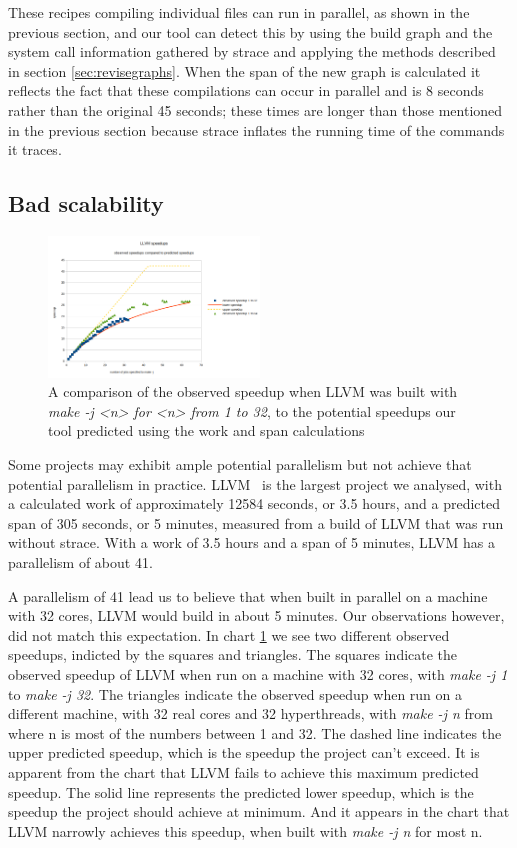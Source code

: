 \documentclass[sigconf,10pt,authorversion]{acmart}\settopmatter{printfolios=true,printccs=false,printacmref=false}
\begin{document}
  These recipes compiling individual files can run in parallel, as shown in the previous section,
  and our tool can detect this by using the build graph and the system call information gathered
  by strace and applying the methods described in section \ref{sec:revisegraphs}.  When the span
  of the new graph is calculated it reflects the fact that these compilations can occur in
  parallel and is 8 seconds rather than the original 45 seconds; these times are longer than
  those mentioned in the previous section because strace inflates the running time of the
  commands it traces.

\subsection{Bad scalability}
\label{sec:scalability}

\begin{figure}[t]
  \includegraphics[width=0.5\textwidth]{llvm-speedup-w-64}
  \caption{A comparison of the observed speedup when LLVM was built with \emph{make -j <n> for <n> from 1 to 32},
    to the potential speedups our tool predicted using the work and span calculations}
  \label{fig:llvm}
\end{figure}

Some projects may exhibit ample potential parallelism but not achieve that potential
parallelism in practice.  LLVM~\citep{LLVM:CGO04} is the largest
project we analysed, with a calculated work of approximately 12584 seconds, or 3.5 hours, and
a predicted span of 305 seconds, or 5 minutes, measured from a build of LLVM that was run without
strace. With a work of 3.5 hours and a span of 5 minutes, LLVM has a parallelism of about 41.

A parallelism of 41 lead us to believe that when built in parallel on a machine with 32 cores,
LLVM would build in about 5 minutes.  Our observations however, did not match this expectation.
In chart \ref{fig:llvm} we see two different observed speedups, indicted by the squares and
triangles.  The squares indicate the observed speedup of LLVM when run on a machine with 32 cores,
with \emph{make -j 1} to \emph{make -j 32}.  The triangles indicate the observed speedup when run
on a different machine, with 32 real cores and 32 hyperthreads, with \emph{make -j n} from where
n is most of the numbers between 1 and 32.  The dashed line indicates the upper predicted speedup,
which is the speedup the project can't exceed.  It is apparent from the chart that LLVM fails to
achieve this maximum predicted speedup.  The solid line represents the predicted lower speedup,
which is the speedup the project should achieve at minimum.  And it appears in the chart that
LLVM narrowly achieves this speedup, when built with \emph{make -j n} for most n.
\end{document}
